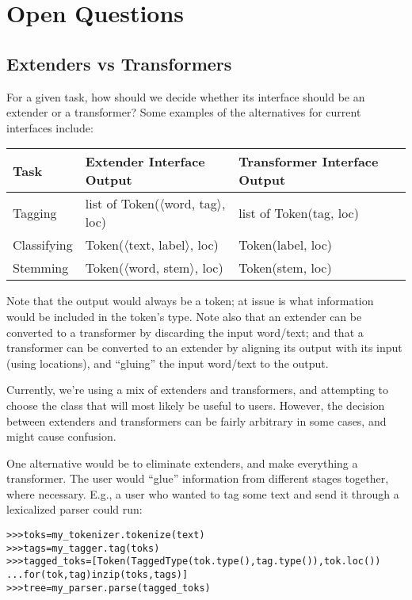 \documentclass[11pt]{article}
\begin{document}
\section{Open Questions}

\subsection{Extenders vs Transformers}

For a given task, how should we decide whether its interface should be
an extender or a transformer?  Some examples of the alternatives for
current interfaces include:

\vspace{3mm}
\begin{tabular}{|l|ll|}
  \hline
  Task & Extender Interface Output& Transformer Interface Output\\
  \hline
  Tagging &
    list of Token($\langle$word, tag$\rangle$, loc) &
    list of Token(tag, loc) \\
  Classifying & 
    Token($\langle$text, label$\rangle$, loc) &
    Token(label, loc) \\
  Stemming & 
    Token($\langle$word, stem$\rangle$, loc) &
    Token(stem, loc) \\
  \hline
\end{tabular}
\vspace{3mm}

Note that the output would always be a token; at issue is what
information would be included in the token's type.  Note also that
an extender can be converted to a transformer by discarding the
input word/text; and that a transformer can be converted to an
extender by aligning its output with its input (using locations),
and ``gluing'' the input word/text to the output.

Currently, we're using a mix of extenders and transformers, and
attempting to choose the class that will most likely be useful to
users.  However, the decision between extenders and transformers can
be fairly arbitrary in some cases, and might cause confusion.

\newpage
One alternative would be to eliminate extenders, and make everything
a transformer.  The user would ``glue'' information from different
stages together, where necessary.  E.g., a user who wanted to tag
some text and send it through a lexicalized parser could run:

\begin{alltt}
  >>> toks = my\_tokenizer.tokenize(text)
  >>> tags = my\_tagger.tag(toks)
  >>> tagged\_toks = [Token(TaggedType(tok.type(), tag.type()), tok.loc())
  ...                for (tok, tag) in zip(toks, tags)]
  >>> tree = my\_parser.parse(tagged\_toks)
\end{alltt}
\end{document}
